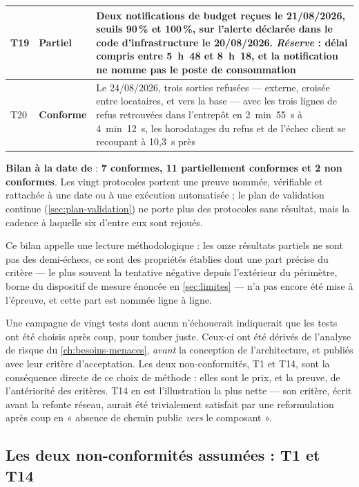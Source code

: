 {\begin{longtable}{|P{0.8cm}|P{1.55cm}|P{12.9cm}|}
T19 & Partiel & Deux notifications de budget reçues le 21/08/2026, seuils 90\,\% et
100\,\%, sur l'alerte déclarée dans le code d'infrastructure le 20/08/2026. \emph{Réserve} : délai
compris entre 5~h~48 et 8~h~18, et la notification ne nomme pas le poste de consommation \\ \hline
T20 & \textbf{Conforme} & Le 24/08/2026, trois sorties refusées --- externe, croisée entre
locataires, et vers la base --- avec les trois lignes de refus retrouvées dans l'entrepôt en
2~min~55~s à 4~min~12~s, les horodatages du refus et de l'échec client se recoupant à 10,3~s
près \\
\hline
\end{longtable}
}

\textbf{Bilan à la date de \dateref} : \textbf{7 conformes, 11 partiellement conformes et 2 non
conformes}. Les vingt protocoles portent une preuve nommée, vérifiable et rattachée à une date ou à
une exécution automatisée ; le plan de validation continue (\cref{sec:plan-validation}) ne porte
plus des protocoles sans résultat, mais la cadence à laquelle six d'entre eux sont rejoués.

Ce bilan appelle une lecture méthodologique : les onze résultats partiels ne sont pas des
demi-échecs, ce sont des propriétés établies dont une part précise du critère --- le plus souvent
la tentative négative depuis l'extérieur du périmètre, borne du dispositif de mesure énoncée en
\cref{sec:limites} --- n'a pas encore été mise à l'épreuve, et cette part est nommée ligne
à ligne.

\begin{keybox}[title={Une campagne sans non-conformité serait suspecte}]
Une campagne de vingt tests dont aucun n'échouerait indiquerait que les tests ont été choisis
après coup, pour tomber juste. Ceux-ci ont été dérivés de l'analyse de risque du \cref{ch:besoins-menaces},
\emph{avant} la conception de l'architecture, et publiés avec leur critère d'acceptation.
Les deux non-conformités, T1 et T14, sont la conséquence directe de ce choix de méthode : elles
sont le prix, et la preuve, de l'antériorité des critères. T14 en est l'illustration la plus
nette --- son critère, écrit avant la refonte réseau, aurait été trivialement satisfait par une
reformulation après coup en « absence de chemin public \emph{vers} le composant ».
\end{keybox}

\subsection{Les deux non-conformités assumées : T1 et T14}
\label{sec:non-conformite-t1}

